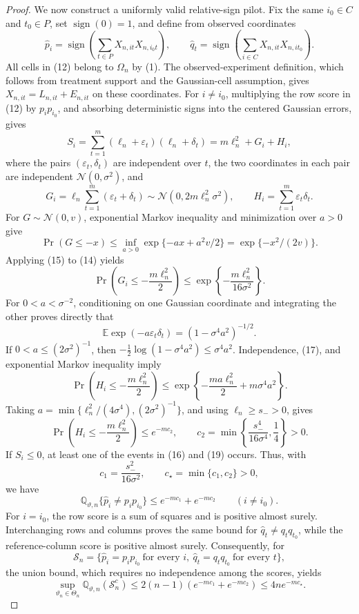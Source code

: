 \documentclass{article}
\begin{document}
\begin{proof}
We now construct a uniformly valid relative-sign pilot.  Fix the same \(i_0\in C\) and \(t_0\in P\), set \(\operatorname{sign}(0)=1\), and define from observed coordinates
\[
\widehat p_i=\operatorname{sign}\!\left(\sum_{t\in P}X_{n,it}X_{n,i_0t}\right),
\qquad
\widehat q_t=\operatorname{sign}\!\left(\sum_{i\in C}X_{n,it}X_{n,it_0}\right).    \tag{12}
\]
All cells in (12) belong to \(\Omega_n\) by (1).  The observed-experiment definition, which follows from treatment support and the Gaussian-cell assumption, gives \(X_{n,it}=L_{n,it}+E_{n,it}\) on these coordinates.  For \(i\ne i_0\), multiplying the row score in (12) by \(p_ip_{i_0}\), and absorbing deterministic signs into the centered Gaussian errors, gives
\[
S_i=\sum_{t=1}^{m}(\ell_n+\varepsilon_t)(\ell_n+\delta_t)
=m\ell_n^2+G_i+H_i,                                    \tag{13}
\]
where the pairs \((\varepsilon_t,\delta_t)\) are independent over \(t\), the two coordinates in each pair are independent \(\mathcal N(0,\sigma^2)\), and
\[
G_i=\ell_n\sum_{t=1}^{m}(\varepsilon_t+\delta_t)
\sim\mathcal N(0,2m\ell_n^2\sigma^2),
\qquad H_i=\sum_{t=1}^{m}\varepsilon_t\delta_t.         \tag{14}
\]
For \(G\sim\mathcal N(0,v)\), exponential Markov inequality and minimization over \(a>0\) give
\[
\Pr(G\le-x)\le\inf_{a>0}\exp\{-ax+a^2v/2\}
=\exp\{-x^2/(2v)\}.                                   \tag{15}
\]
Applying (15) to (14) yields
\[
\Pr\!\left(G_i\le-\frac{m\ell_n^2}{2}\right)
\le\exp\!\left\{-\frac{m\ell_n^2}{16\sigma^2}\right\}.       \tag{16}
\]
For \(0<a<\sigma^{-2}\), conditioning on one Gaussian coordinate and integrating the other proves directly that
\[
\mathbb E\exp(-a\varepsilon_t\delta_t)
=(1-\sigma^4a^2)^{-1/2}.                                \tag{17}
\]
If \(0<a\le(2\sigma^2)^{-1}\), then \(-\tfrac12\log(1-\sigma^4a^2)\le\sigma^4a^2\).  Independence, (17), and exponential Markov inequality imply
\[
\Pr\!\left(H_i\le-\frac{m\ell_n^2}{2}\right)
\le\exp\!\left\{-\frac{ma\ell_n^2}{2}+m\sigma^4a^2\right\}.  \tag{18}
\]
Taking \(a=\min\{\ell_n^2/(4\sigma^4),(2\sigma^2)^{-1}\}\), and using \(\ell_n\ge s_->0\), gives
\[
\Pr\!\left(H_i\le-\frac{m\ell_n^2}{2}\right)\le e^{-mc_2},
\qquad
c_2=\min\!\left\{\frac{s_-^4}{16\sigma^4},\frac14\right\}>0. \tag{19}
\]
If \(S_i\le0\), at least one of the events in (16) and (19) occurs.  Thus, with
\[
c_1=\frac{s_-^2}{16\sigma^2},\qquad c_\star=\min\{c_1,c_2\}>0,
\]
we have
\[
\mathbb Q_{\vartheta,n}\{\widehat p_i\ne p_ip_{i_0}\}
\le e^{-mc_1}+e^{-mc_2}\qquad(i\ne i_0).               \tag{20}
\]
For \(i=i_0\), the row score is a sum of squares and is positive almost surely.  Interchanging rows and columns proves the same bound for \(\widehat q_t\ne q_tq_{t_0}\), while the reference-column score is positive almost surely.  Consequently, for
\[
\mathcal S_n=
\{\widehat p_i=p_ip_{i_0}\ \text{for every }i,
\ \widehat q_t=q_tq_{t_0}\ \text{for every }t\},
\]
the union bound, which requires no independence among the scores, yields
\[
\sup_{\vartheta_n\in\Theta_n}
\mathbb Q_{\vartheta,n}(\mathcal S_n^c)
\le2(n-1)(e^{-mc_1}+e^{-mc_2})
\le4ne^{-mc_\star}.                                    \tag{21}
\]


\end{proof}
\end{document}
